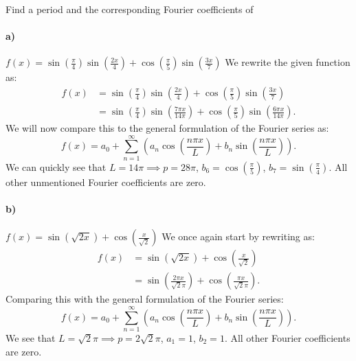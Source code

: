 
 Find a period and the corresponding Fourier coefficients of

\paragraph{a)} $f(x) = \sin \left( \frac{\pi}{4} \right) \sin \left( \frac{2x}{4} \right) + \cos \left( \frac{\pi}{5}\right) \sin \left( \frac{3x}{7} \right)$
\bigbreak
We rewrite the given function as:
\begin{align*}
  f(x) &= \sin \left( \frac{\pi}{4} \right) \sin \left( \frac{2x}{4} \right) + \cos \left( \frac{\pi}{5} \right) \sin \left( \frac{3x}{7} \right) \\
  &= \sin \left( \frac{\pi}{4} \right) \sin \left( \frac{7 \pi x}{14 \pi} \right) + \cos \left( \frac{\pi}{5} \right) \sin \left( \frac{6 \pi x}{14 \pi} \right)
.\end{align*}
We will now compare this to the general formulation of the Fourier series as:
\[ 
f(x) = a_0 + \sum_{n = 1}^{\infty} \left( a_n \cos \left( \frac{n \pi x}{L} \right) + b_n \sin \left( \frac{n \pi x}{L} \right) \right)
.\]
We can quickly see that $L = 14 \pi \implies p = 28 \pi$, $b_6 = \cos \left( \frac{\pi}{5} \right)$, $b_7 = \sin \left( \frac{\pi}{4} \right)$. All other unmentioned Fourier coefficients are zero.


\paragraph{b)} $f(x) = \sin \left( \sqrt{2x} \right) + \cos \left( \frac{x}{\sqrt{2}} \right)$
\bigbreak
We once again start by rewriting as:
\begin{align*}
  f(x) &= \sin \left( \sqrt{2x} \right) + \cos \left( \frac{x}{\sqrt{2}} \right) \\
       &= \sin \left( \frac{2\pi x}{\sqrt{2}\pi} \right) + \cos \left( \frac{\pi x}{\sqrt{2}\pi} \right)
.\end{align*}
Comparing this with the general formulation of the Fourier series:
\[ 
f(x) = a_0 + \sum_{n = 1}^{\infty} \left( a_n \cos \left( \frac{n \pi x}{L} \right) + b_n \sin \left( \frac{n \pi x}{L} \right) \right)
.\]
We see that $L = \sqrt{2} \pi \implies p = 2 \sqrt{2} \pi$, $a_1 = 1$, $b_2 = 1$. All other Fourier coefficients are zero.

